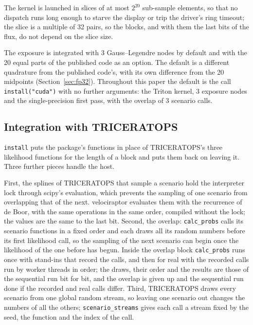 \documentclass[11pt]{article}
\begin{document}
The kernel is launched in slices of at most $2^{20}$ sub-sample elements, so that no dispatch runs long enough to starve the display or trip the driver's ring timeout; the slice is a multiple of 32 pairs, so the blocks, and with them the last bits of the flux, do not depend on the slice size.

The exposure is integrated with 3 Gauss--Legendre nodes by default and with the 20 equal parts of the published code as an option. The default is a different quadrature from the published code's, with its own difference from the 20 midpoints (Section~\ref{sec:fp32}). Throughout this paper the default is the call \texttt{install("cuda")} with no further arguments: the Triton kernel, 3 exposure nodes and the single-precision first pass, with the overlap of 3 scenario calls.

\subsection{Integration with TRICERATOPS}

\texttt{install} puts the package's functions in place of TRICERATOPS's three likelihood functions for the length of a block and puts them back on leaving it. Three further pieces handle the host.

First, the splines of TRICERATOPS that sample a scenario hold the interpreter lock through scipy's evaluation, which prevents the sampling of one scenario from overlapping that of the next. velociraptor evaluates them with the recurrence of de Boor, with the same operations in the same order, compiled without the lock; the values are the same to the last bit. Second, the overlap: \texttt{calc\_probs} calls its scenario functions in a fixed order and each draws all its random numbers before its first likelihood call, so the sampling of the next scenario can begin once the likelihood of the one before has begun. Inside the overlap block \texttt{calc\_probs} runs once with stand-ins that record the calls, and then for real with the recorded calls run by worker threads in order; the draws, their order and the results are those of the sequential run bit for bit, and the overlap is given up and the sequential run done if the recorded and real calls differ. Third, TRICERATOPS draws every scenario from one global random stream, so leaving one scenario out changes the numbers of all the others; \texttt{scenario\_streams} gives each call a stream fixed by the seed, the function and the index of the call.
\end{document}
